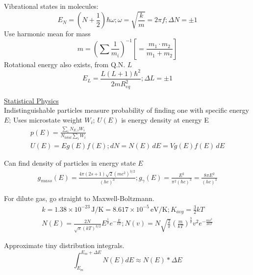 \documentclass[8pt]{extarticle}
\newcommand{\e}[1]{e^{#1}}
\newcommand{\E}[1]{\times 10^{#1}}
\begin{document}
        Vibrational states in molecules:
        \begin{equation*}
            E_N = (N + \frac{1}{2})\hbar \omega; 
            \omega = \sqrt{\frac{k}{m}} = 2\pi f;
            \Delta N = \pm 1
        \end{equation*}
        Use harmonic mean for mass
        \begin{equation*}
            m = \left( \sum \frac{1}{m_i} \right)^{-1} \left[ = \frac{m_1 \cdot m_2}{m_1 + m_2} \right]
        \end{equation*}
        Rotational energy also exists, from Q.N. $L$
        \begin{equation*}
            E_L = \frac{L(L+1)\hbar^2}{2mR_{eq}^2};
            \Delta L = \pm 1
        \end{equation*}

    \underline{Statistical Physics}\\
        Indistinguishable particles measure probability of finding one with specific energy $E$; 
        Uses microstate weight $W_i$;
        $U(E)$ is energy density at energy E
        \begin{gather*}
            p(E) = \frac{\sum_{i}^{} N_{E,i} W_i}{N_{total} \sum_{i}^{}W_i}\\
            U(E) = E g(E) f(E);
            dN = N(E)\,dE = V g(E) f(E)\,dE
        \end{gather*}

        Can find density of particles in energy state $E$
        \begin{gather*}
            g_{mass}(E) = \frac{4\pi(2s + 1)\sqrt{2}(mc^2)^{3/2}}{(hc)^3};
            g_{\gamma}(E) = \frac{E^2}{\pi^2(\hbar c)^3} = \frac{8\pi E^2}{(hc)^3}
        \end{gather*}

        For dilute gas, go straight to Maxwell-Boltzmann.
        \begin{gather*}
            k = 1.38\E{-23}\,\unit{\joule/\kelvin} = 8.617\E{-5}\,\unit{\eV/\kelvin};
            K_{avg} = \frac{3}{2}kT\\
            N(E) = \frac{2N}{\sqrt{\pi}(kT)^{3/2}}E^{\frac{1}{2}}\e{-\frac{E}{kT}};
            N(v) = N \sqrt{\frac{2}{\pi}}\left( \frac{m}{kT} \right)^\frac{3}{2} v^2 \e{-\frac{mv^2}{2kT}}
        \end{gather*}

        Approximate tiny distribution integrals.
        \begin{equation*}
            \int_{E_m}^{E_m + \Delta E} N(E) dE \approx N(E) * \Delta E
        \end{equation*}
\end{document}
